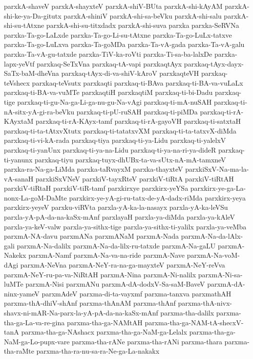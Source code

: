 {parxkA-shaveV
parxkA-shayxteV
parxkA-shiV-BUta
parxkA-shi-kAyAM
parxkA-shi-ke-ya-Da-gitutx
parxkA-shiniV
parxkA-shi-sa-beVku
parxkA-shi-salu
parxkA-shi-su-tAtxne
parxkA-shi-su-titxdadx
parxkA-shi-suva
parxka
parxka-SeRVNa
parxka-Ta-go-LaLxde
parxka-Ta-go-Li-su-tAtxne
parxka-Ta-go-LuLx-tatxve
parxka-Ta-go-LuLxva
parxka-Ta-goMDa
parxka-Ta-vA-gada
parxka-Ta-vA-galu
parxka-Ta-vA-gu-tatxde
parxka-TiV-ka-roVti
parxka-Ti-sa-ba-lalxDe
parxka-lapx-yeVtf
parxkaq-SeTxVna
parxkaq-tA-vapi
parxkaqtAyx
parxkaq-tAyx-dayx-SaTx-baM-dheVna
parxkaq-tAyx-di-va-shiV-kAroV
parxkaqteVH
parxkaq-teVshecx
parxkaq-teVsutx
parxkaqti
parxkaq-ti-BAva
parxkaq-ti-BA-va-vuLaLx
parxkaq-ti-BA-va-vuMTe
parxkaqtiH
parxkaqtiM
parxkaq-ti-bi-Dadu
parxkaq-tige
parxkaq-ti-gu-Na-ga-Li-ga-nu-gu-Na-vAgi
parxkaq-ti-mA-nuSAH
parxkaq-ti-nA-sitx-yA-gi-ra-beVku
parxkaq-ti-pU-ruSAH
parxkaq-ti-piMDa
parxkaq-ti-rA-KAyxtaM
parxkaq-ti-rA-KAyx-tamf
parxkaq-ti-rA-gayoVH
parxkaq-ti-satxtaH
parxkaq-ti-ta-tAtxvXtutx
parxkaq-ti-tatatxvXM
parxkaq-ti-ta-tatxvX-diMda
parxkaq-ti-vi-kA-rada
parxkaq-tiya
parxkaq-ti-ya-Lidu
parxkaq-ti-yalelxV
parxkaq-ti-yanUnx
parxkaq-ti-ya-na-Lidu
parxkaq-ti-ya-na-ri-ya-dideR
parxkaq-ti-yanunx
parxkaq-tiyu
parxkaq-tuyx-dhUBx-ta-va-sUtx-nA-mA-tamxneV
parxka-ra-Na-ga-LiMda
parxka-taRvayxM
parxka-thayxteV
parxkiSxV-Na-ma-la-vA-sanaH
parxkiSxVNeV
parxkiV-tayxRteV
parxkiV-tiRtA
parxkiV-tiRtAH
parxkiV-tiRtaH
parxkiV-tiR-tamf
parxkirxye
parxkirx-yeYSa
parxkirx-ye-ga-La-nonx-La-goM-DaMte
parxkirx-ye-yA-gi-ru-tatx-de-yA-dadx-riMda
parxkirx-yeya
parxkirx-yeyeV
parxku-viRVta
parxla-yA-ka-la-nasayx
parxla-yA-ka-leVSu
parxla-yA-pA-da-na-kaSx-mAnf
parxlayaH
parxla-ya-diMda
parxla-ya-kAleV
parxla-ya-keV-valw
parxla-ya-sithx-tige
parxla-ya-sithx-ti-yalilx
parxla-ya-veMba
parxmA-NA-davu
parxmANa
parxmANaM
parxmA-Nada
parxmA-Na-da-lAlx-gali
parxmA-Na-dalilx
parxmA-Na-da-lilx-ru-tatxde
parxmA-Na-gaLU
parxmA-Nakekx
parxmA-Namf
parxmA-Na-va-na-ride
parxmA-Nave
parxmA-Na-voM-dAgi
parxmA-NeVna
parxmA-NeY-ra-na-ga-mayxteV
parxmA-NeY-reVva
parxmA-NeY-ru-pa-va-NiRtAH
parxmA-Nina
parxmA-Ni-nalilx
parxmA-Ni-sa-luMTe
parxmA-Nisi
parxmANu
parxmA-dA-dodxV-Sa-saM-BaveV
parxmA-dA-ninx-yameV
parxmAdeV
parxma-di-ta-vayxmf
parxma-tanxva
parxmathAH
parxma-thA-dhiV-shAnf
parxma-thAnAM
parxma-thAnf
parxma-thA-nivx-shavx-ni-mAR-Na-parx-la-yA-pA-da-na-kaSx-mAnf
parxma-tha-dalilx
parxma-tha-ga-La-va-re-gina
parxma-tha-ga-NAMtAH
parxma-tha-ga-NAM-tA-shecxV-tanA
parxma-tha-ga-NAshacx
parxma-tha-ga-NaM-ga-Lelalx
parxma-tha-ga-NaM-ga-Lo-pupx-vare
parxma-tha-rANe
parxma-tha-rANi
parxma-thara
parxma-tha-raMte
parxma-tha-ra-nu-sa-ra-Ne-ga-La-nakakx
}
